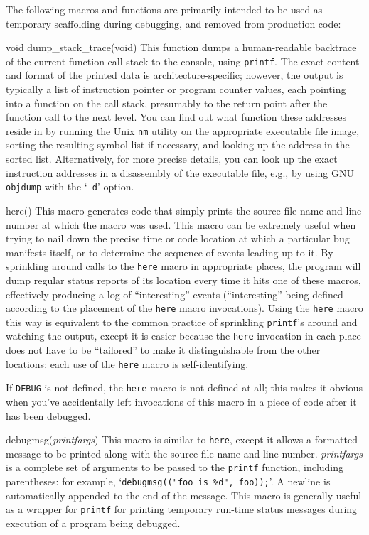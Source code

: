 \begin{apidesc}
	The following macros and functions
	are primarily intended to be used as temporary scaffolding
	during debugging, and removed from production code:
	\begin{csymlist}
	\item[void dump_stack_trace(void)]	
		This function dumps a human-readable backtrace
		of the current function call stack
		to the console, using {\tt printf}.
		The exact content and format of the printed data
		is architecture-specific;
		however, the output is typically a list of
		instruction pointer or program counter values,
		each pointing into a function on the call stack,
		presumably to the return point
		after the function call to the next level.
		You can find out what function these addresses reside in
		by running the Unix {\tt nm} utility
		on the appropriate executable file image,
		sorting the resulting symbol list if necessary,
		and looking up the address in the sorted list.
		Alternatively, for more precise details,
		you can look up the exact instruction addresses
		in a disassembly of the executable file,
		e.g., by using GNU {\tt objdump} with the `{\tt -d}' option.
	\item[here()]				
		This macro generates code
		that simply prints the source file name and line number
		at which the macro was used.
		This macro can be extremely useful
		when trying to nail down the precise time or code location
		at which a particular bug manifests itself,
		or to determine the sequence of events leading up to it.
		By sprinkling around calls to the {\tt here} macro
		in appropriate places,
		the program will dump regular status reports of its location
		every time it hits one of these macros,
		effectively producing a log of ``interesting'' events
		(``interesting'' being defined according to
		the placement of the {\tt here} macro invocations).
		Using the {\tt here} macro this way
		is equivalent to the common practice
		of sprinkling {\tt printf}'s around and watching the output,
		except it is easier because the {\tt here} invocation
		in each place does not have to be ``tailored''
		to make it distinguishable from the other locations:
		each use of the {\tt here} macro is self-identifying.

		If {\tt DEBUG} is not defined,
		the {\tt here} macro is not defined at all;
		this makes it obvious when you've accidentally
		left invocations of this macro in a piece of code
		after it has been debugged.

	\item[debugmsg(\emph{printfargs})]	
		This macro is similar to {\tt here},
		except it allows a formatted message to be printed
		along with the source file name and line number.
		\emph{printfargs} is a complete set of arguments
		to be passed to the {\tt printf} function,
		including parentheses: for example,
		`{\tt debugmsg(("foo is \%d", foo));}'.
		A newline is automatically appended
		to the end of the message.
		This macro is generally useful as a wrapper for {\tt printf}
		for printing temporary run-time status messages
		during execution of a program being debugged.


\end{csymlist}
\end{apidesc}
